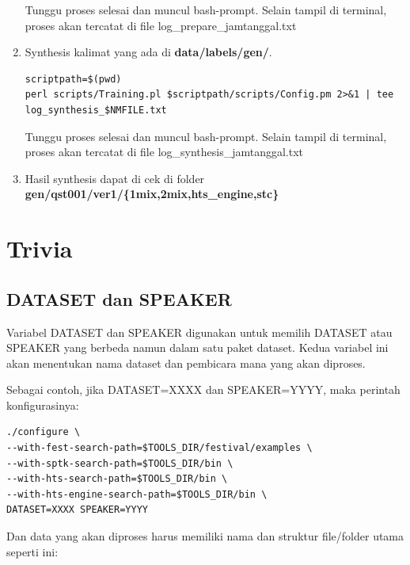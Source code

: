 \documentclass[12pt,]{article}
\begin{document}
\begin{enumerate}
		Tunggu proses selesai dan muncul bash-prompt.
		Selain tampil di terminal, proses akan tercatat di file log\_prepare\_jamtanggal.txt
		
		\item Synthesis kalimat yang ada di \textbf{data/labels/gen/}.
		\begin{verbatim}
scriptpath=$(pwd)
perl scripts/Training.pl $scriptpath/scripts/Config.pm 2>&1 | tee log_synthesis_$NMFILE.txt
		\end{verbatim}
		
		Tunggu proses selesai dan muncul bash-prompt.
		Selain tampil di terminal, proses akan tercatat di file log\_synthesis\_jamtanggal.txt
		
		\item Hasil synthesis dapat di cek di folder \textbf{gen/qst001/ver1/\{1mix,2mix,hts\_engine,stc\}}
		
	\end{enumerate}
		
	\newpage
	\section{Trivia}
	
	\subsection{DATASET dan SPEAKER}
	
	Variabel DATASET dan SPEAKER digunakan untuk memilih DATASET atau SPEAKER yang berbeda namun dalam satu paket dataset.
	Kedua variabel ini akan menentukan nama dataset dan pembicara mana yang akan diproses.
	
	Sebagai contoh, jika DATASET=XXXX dan SPEAKER=YYYY, maka perintah konfigurasinya:
	
	\begin{verbatim}
./configure \
--with-fest-search-path=$TOOLS_DIR/festival/examples \
--with-sptk-search-path=$TOOLS_DIR/bin \
--with-hts-search-path=$TOOLS_DIR/bin \
--with-hts-engine-search-path=$TOOLS_DIR/bin \
DATASET=XXXX SPEAKER=YYYY
	\end{verbatim}
	
	Dan data yang akan diproses harus memiliki nama dan struktur file/folder utama seperti ini:
	
\end{document}
